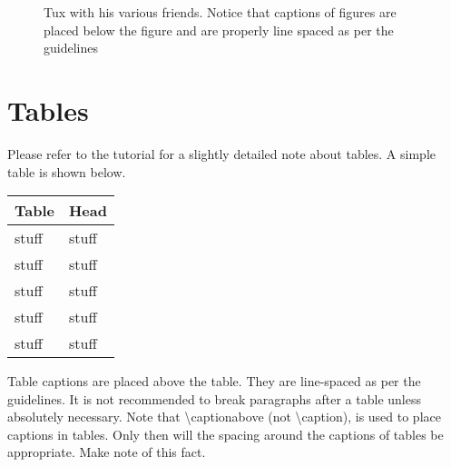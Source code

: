 \begin{figure}
    \hfill
    \hfill
    \hfill
    \hfill
    \par
    \hfill
    \hfill
    \hfill
\caption{Tux with his various friends. Notice that captions of figures are
placed below the figure and are properly line spaced as per the guidelines}
\label{fig:tux-with-friends}
\end{figure}
%
%
%
%
\section{Tables}
Please refer to the tutorial for a slightly detailed note about tables. A
simple table is shown below.
\begin{table}
    \centering
    \begin{tabular}{ll}
        \toprule
        \textbf{Table} & \textbf{Head}  \\
        \midrule
        stuff & stuff \\
        stuff & stuff \\
        stuff & stuff \\
        stuff & stuff \\
        stuff & stuff \\
        \bottomrule
    \end{tabular}
\label{tab:elegant-table}
\end{table}
Table captions are placed above the table. They are line-spaced as per the
guidelines. It is not recommended to break paragraphs after a table unless
absolutely necessary. Note that {\ttfamily \textbackslash captionabove}  
(not {\ttfamily \textbackslash caption}), is used to place captions in tables. 
Only then will the spacing around the captions of tables be appropriate. Make 
note of this fact.

